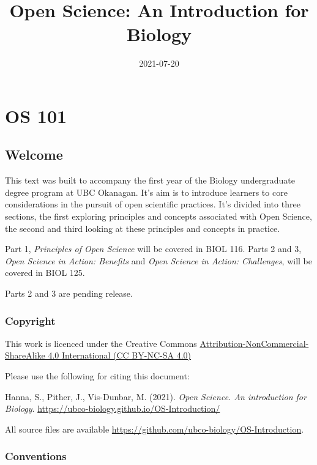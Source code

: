 \documentclass[
]{book}
\title{Open Science: An Introduction for Biology}
\author{}
\date{\vspace{-2.5em}2021-07-20}
\begin{document}
\maketitle

{
\setcounter{tocdepth}{1}
\tableofcontents
}
\hypertarget{part-os-101}{%
\part*{OS 101}\label{part-os-101}}

\hypertarget{welcome}{%
\chapter*{Welcome}\label{welcome}}

This text was built to accompany the first year of the Biology undergraduate degree program at UBC Okanagan. It's aim is to introduce learners to core considerations in the pursuit of open scientific practices. It's divided into three sections, the first exploring principles and concepts associated with Open Science, the second and third looking at these principles and concepts in practice.

Part 1, \emph{Principles of Open Science} will be covered in BIOL 116. Parts 2 and 3, \emph{Open Science in Action: Benefits} and \emph{Open Science in Action: Challenges}, will be covered in BIOL 125.

Parts 2 and 3 are pending release.

\hypertarget{copyright}{%
\section*{Copyright}\label{copyright}}

This work is licenced under the Creative Commons \href{https://creativecommons.org/licenses/by-nc-sa/4.0/}{Attribution-NonCommercial-ShareAlike 4.0 International (CC BY-NC-SA 4.0)}

Please use the following for citing this document:

Hanna, S., Pither, J., Vis-Dunbar, M. (2021). \emph{Open Science. An introduction for Biology}. \url{https://ubco-biology.github.io/OS-Introduction/}

All source files are available \href{}{https://github.com/ubco-biology/OS-Introduction}.

\hypertarget{conventions}{%
\section*{Conventions}\label{conventions}}
\end{document}
